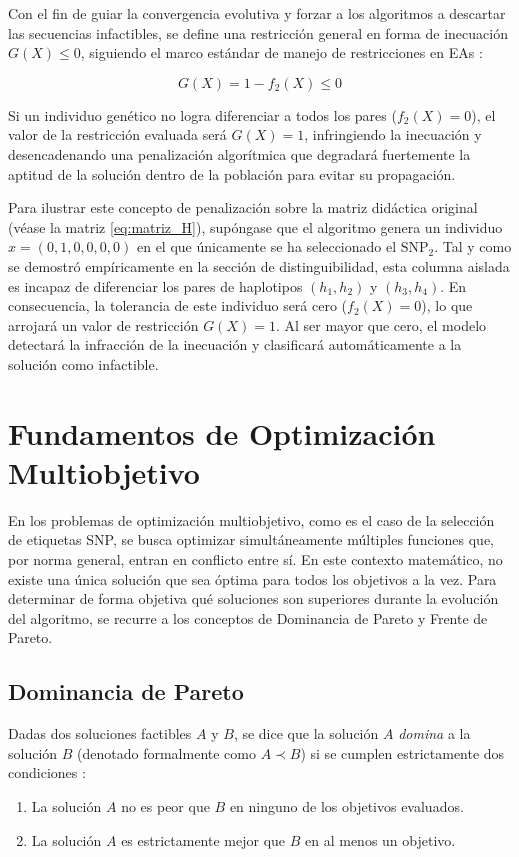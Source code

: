Con el fin de guiar la convergencia evolutiva y forzar a los algoritmos a descartar las secuencias infactibles, se define una restricción general en forma de inecuación $G(X) \le 0$, siguiendo el marco estándar de manejo de restricciones en EAs \cite{deb2001multiobjective}:

\begin{equation}
    G(X) = 1 - f_2(X) \le 0
\end{equation}

Si un individuo genético no logra diferenciar a todos los pares ($f_2(X) = 0$), el valor de la restricción evaluada será $G(X) = 1$, infringiendo la inecuación y desencadenando una penalización algorítmica que degradará fuertemente la aptitud de la solución dentro de la población para evitar su propagación.

Para ilustrar este concepto de penalización sobre la matriz didáctica original (véase la matriz \ref{eq:matriz_H}), supóngase que el algoritmo genera un individuo $x = (0, 1, 0, 0, 0, 0)$ en el que únicamente se ha seleccionado el $\text{SNP}_2$. Tal y como se demostró empíricamente en la sección de distinguibilidad, esta columna aislada es incapaz de diferenciar los pares de haplotipos $(h_1, h_2)$ y $(h_3, h_4)$. En consecuencia, la tolerancia de este individuo será cero ($f_2(X) = 0$), lo que arrojará un valor de restricción $G(X) = 1$. Al ser mayor que cero, el modelo detectará la infracción de la inecuación y clasificará automáticamente a la solución como infactible.

\section{Fundamentos de Optimización Multiobjetivo}

En los problemas de optimización multiobjetivo, como es el caso de la selección de etiquetas SNP, se busca optimizar simultáneamente múltiples funciones que, por norma general, entran en conflicto entre sí. En este contexto matemático, no existe una única solución que sea óptima para todos los objetivos a la vez. Para determinar de forma objetiva qué soluciones son superiores durante la evolución del algoritmo, se recurre a los conceptos de Dominancia de Pareto y Frente de Pareto.

\subsection{Dominancia de Pareto}
Dadas dos soluciones factibles $A$ y $B$, se dice que la solución $A$ \textit{domina} a la solución $B$ (denotado formalmente como $A \prec B$) si se cumplen estrictamente dos condiciones \cite{deb2001multiobjective}:
\begin{enumerate}
    \item La solución $A$ no es peor que $B$ en ninguno de los objetivos evaluados.
    \item La solución $A$ es estrictamente mejor que $B$ en al menos un objetivo.
\end{enumerate}


